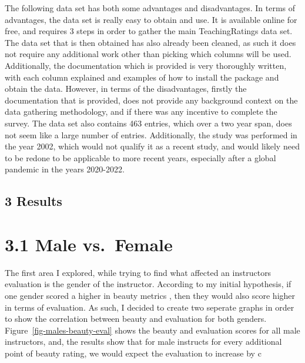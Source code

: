 \documentclass[
  letterpaper,
  DIV=11,
  numbers=noendperiod]{scrartcl}
\begin{document}
The following data set has both some advantages and disadvantages. In
terms of advantages, the data set is really easy to obtain and use. It
is available online for free, and requires 3 steps in order to gather
the main TeachingRatings data set. The data set that is then obtained
has also already been cleaned, as such it does not require any
additional work other than picking which columns will be used.
Additionally, the documentation which is provided is very thoroughly
written, with each column explained and examples of how to install the
package and obtain the data. However, in terms of the disadvantages,
firstly the documentation that is provided, does not provide any
background context on the data gathering methodology, and if there was
any incentive to complete the survey. The data set also contains 463
entries, which over a two year span, does not seem like a large number
of entries. Additionally, the study was performed in the year 2002,
which would not qualify it as a recent study, and would likely need to
be redone to be applicable to more recent years, especially after a
global pandemic in the years 2020-2022.

\hypertarget{results}{%
\subsection{3 Results}\label{results}}

\hypertarget{male-vs.-female}{%
\section{3.1 Male vs.~Female}\label{male-vs.-female}}

The first area I explored, while trying to find what affected an
instructors evaluation is the gender of the instructor. According to my
initial hypothesis, if one gender scored a higher in beauty metrics ,
then they would also score higher in terms of evaluation. As such, I
decided to create two seperate graphs in order to show the correlation
between beauty and evaluation for both genders.
Figure~\ref{fig-males-beauty-eval} shows the beauty and evaluation
scores for all male instructors, and, the results show that for male
instructs for every additional point of beauty rating, we would expect
the evaluation to increase by c
\end{document}
